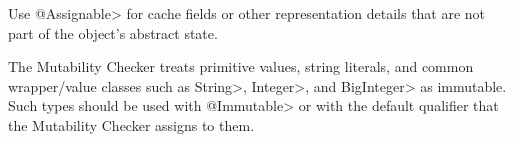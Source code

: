 Use \<@Assignable> for cache fields or other representation details that
are not part of the object's abstract state.


The Mutability Checker treats primitive values, string literals, and common wrapper/value
classes such as \<String>, \<Integer>, and \<BigInteger> as immutable.
Such types should be used with \<@Immutable> or with the default qualifier
that the Mutability Checker assigns to them.
